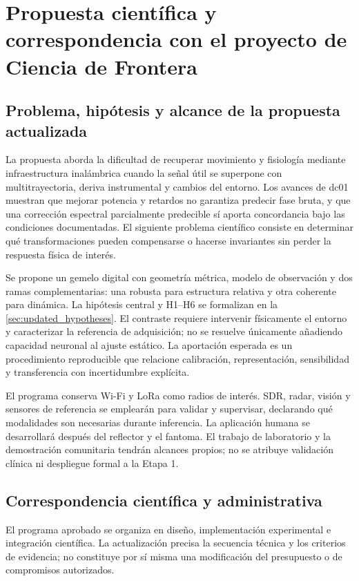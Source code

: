 \chapter{Propuesta científica y correspondencia con el proyecto de Ciencia de Frontera}
\label{ch:secihti_mapping}

\section{Problema, hipótesis y alcance de la propuesta actualizada}

La propuesta aborda la dificultad de recuperar movimiento y fisiología mediante
infraestructura inalámbrica cuando la señal útil se superpone con multitrayectoria,
deriva instrumental y cambios del entorno. Los avances de dc01 muestran que mejorar
potencia y retardos no garantiza predecir fase bruta, y que una corrección espectral
parcialmente predecible sí aporta concordancia bajo las condiciones documentadas.
El siguiente problema científico consiste en determinar qué transformaciones pueden
compensarse o hacerse invariantes sin perder la respuesta física de interés.

Se propone un gemelo digital con geometría métrica, modelo de observación y dos ramas
complementarias: una robusta para estructura relativa y otra coherente para dinámica.
La hipótesis central y H1--H6 se formalizan en la \cref{sec:updated_hypotheses}.
El contraste requiere intervenir físicamente el entorno y caracterizar la referencia
de adquisición; no se resuelve únicamente añadiendo capacidad neuronal al ajuste
estático. La aportación esperada es un procedimiento reproducible que relacione
calibración, representación, sensibilidad y transferencia con incertidumbre explícita.

El programa conserva Wi-Fi y LoRa como radios de interés. SDR, radar, visión y
sensores de referencia se emplearán para validar y supervisar, declarando qué modalidades
son necesarias durante inferencia. La aplicación humana se desarrollará después del
reflector y el fantoma. El trabajo de laboratorio y la demostración comunitaria tendrán
alcances propios; no se atribuye validación clínica ni despliegue formal a la Etapa 1.

\section{Correspondencia científica y administrativa}

El programa aprobado se organiza en diseño, implementación experimental e integración
científica. La actualización precisa la secuencia técnica y los criterios de evidencia;
no constituye por sí misma una modificación del presupuesto o de compromisos autorizados.

